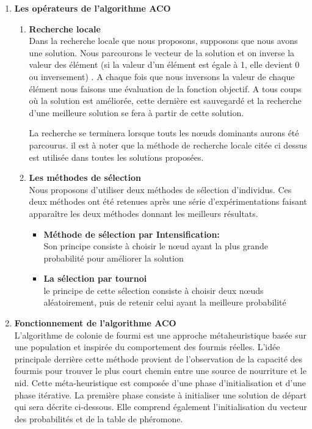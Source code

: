 \begin{enumerate}
	\item \textbf{Les opérateurs de l’algorithme ACO}\\
\begin{enumerate}[label=\alph*)]
	\item \textbf{Recherche locale}\\
	Dans la recherche locale que nous proposons, supposons que nous avons une solution. Nous parcourons le vecteur de la solution et on inverse la valeur des élément (si la valeur d’un élément est égale à 1, elle devient 0 ou inversement) . A chaque fois que nous inversons  la valeur  de chaque élément nous faisons une évaluation de la fonction objectif. A tous coups où la solution est améliorée, cette dernière est sauvegardé et la recherche d’une meilleure solution se fera à partir de cette solution.
	
La recherche se terminera lorsque touts  les nœuds dominants aurons été parcourus.
il est à noter que la méthode de recherche locale citée ci dessus est utilisée dans toutes les solutions proposées.
	
	\item \textbf{Les méthodes de sélection}\\
	Nous proposons d'utiliser deux méthodes de sélection d’individus. Ces deux méthodes ont été retenues après une série d'expérimentations faisant apparaître les deux méthodes donnant les meilleurs résultats.

	\begin{itemize}
		\item \textbf{Méthode de sélection par Intensification: }\\
		Son principe consiste à choisir le nœud ayant la plus grande probabilité pour améliorer la solution 
		
		\item \textbf{La sélection par tournoi}\\
		le principe de cette sélection consiste à choisir deux nœuds aléatoirement, puis de retenir celui ayant la meilleure probabilité 
	\end{itemize}
\end{enumerate}
	


	\item \textbf{Fonctionnement de l’algorithme ACO}\\
L’algorithme de colonie de fourmi est une approche métaheuristique basée sur une  population et inspirée du comportement des fourmis réelles. L’idée principale derrière cette méthode provient de l’observation de la capacité des fourmis pour trouver le plus court chemin entre une  source de nourriture et le nid.
Cette méta-heuristique est composée d’une phase d’initialisation et d’une phase itérative. La première phase consiste à initialiser une solution de départ qui sera décrite ci-dessous. Elle comprend également l’initialisation du vecteur des probabilités et de la table de phéromone.


\end{enumerate}
